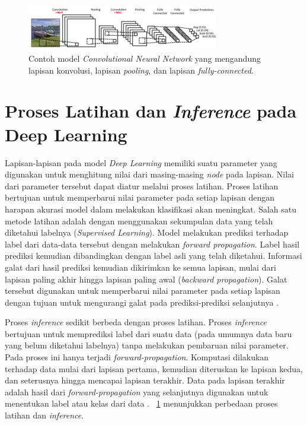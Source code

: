 \begin{figure}
	\centering
	\includegraphics[width=0.75\textwidth]
	{pics/cnn.png}
	\caption{Contoh model \textit{Convolutional Neural Network} yang mengandung lapisan konvolusi, lapisan \textit{pooling}, dan lapisan \textit{fully-connected}.}
	\label{fig:cnn}
\end{figure}

\section{Proses Latihan dan \textit{Inference} pada Deep Learning}
Lapisan-lapisan pada model \textit{Deep Learning} memiliki suatu parameter yang digunakan untuk menghitung nilai dari masing-masing \textit{node} pada lapisan. Nilai dari parameter tersebut dapat diatur melalui proses latihan. Proses latihan bertujuan untuk memperbarui nilai parameter pada setiap lapisan dengan harapan akurasi model dalam melakukan klasifikasi akan meningkat. Salah satu metode latihan adalah dengan menggunakan sekumpulan data yang telah diketahui labelnya (\textit{Supervised Learning}). Model melakukan prediksi terhadap label dari data-data tersebut dengan melakukan \textit{forward propagation}. Label hasil prediksi kemudian dibandingkan dengan label asli yang telah diketahui. Informasi galat dari hasil prediksi kemudian dikirimkan ke semua lapisan, mulai dari lapisan paling akhir hingga lapisan paling awal (\textit{backward propagation}). Galat tersebut digunakan untuk memperbarui nilai parameter pada setiap lapisan dengan tujuan untuk mengurangi galat pada prediksi-prediksi selanjutnya \cite{deeplearning}. 

Proses \textit{inference} sedikit berbeda dengan proses latihan. Proses \textit{inference} bertujuan untuk memprediksi label dari suatu data (pada umumnya data baru yang belum diketahui labelnya) tanpa melakukan pembaruan nilai parameter. Pada proses ini hanya terjadi \textit{forward-propagation}. Komputasi dilakukan terhadap data mulai dari lapisan pertama, kemudian diteruskan ke lapisan kedua, dan seterusnya hingga mencapai lapisan terakhir. Data pada lapisan terakhir adalah hasil dari \textit{forward-propagation} yang selanjutnya digunakan untuk menentukan label atau kelas dari data \cite{deeplearningmatrix}. \pic~\ref{fig:cnn} menunjukkan perbedaan proses latihan dan \textit{inference}.

